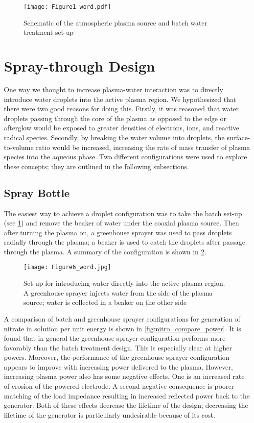 \begin{figure}[htbp]
  \centering
  \texttt{[image: Figure1\_word.pdf]}
  \caption{Schematic of the atmospheric plasma source and batch water treatment set-up}
  \label{fig:batch_scheme}
\end{figure}

\section{Spray-through Design}

One way we thought to increase plasma-water interaction was to directly introduce water droplets into the active plasma region. We hypothesized that there were two good reasons for doing this. Firstly, it was reasoned that water droplets passing through the core of the plasma as opposed to the edge or afterglow would be exposed to greater densities of electrons, ions, and reactive radical species. Secondly, by breaking the water volume into droplets, the surface-to-volume ratio would be increased, increasing the rate of mass transfer of plasma species into the aqueous phase. Two different configurations were used to explore these concepts; they are outlined in the following subsections.

\subsection{Spray Bottle}
\label{sec:spray_bottle}

The easiest way to achieve a droplet configuration was to take the batch set-up (see \cref{fig:batch_scheme}) and remove the beaker of water under the coaxial plasma source. Then after turning the plasma on, a greenhouse sprayer was used to pass droplets radially through the plasma; a beaker is used to catch the droplets after passage through the plasma. A summary of the configuration is shown in \cref{fig:spray_scheme}.

\begin{figure}[htbp]
  \centering
  \texttt{[image: Figure6\_word.jpg]}
  \caption{Set-up for introducing water directly into the active plasma region.  A greenhouse sprayer injects water from the side of the plasma source; water is collected in a beaker on the other side}
  \label{fig:spray_scheme}
\end{figure}

A comparison of batch and greenhouse sprayer configurations for generation of nitrate in solution per unit energy is shown in \cref{fig:nitro_compare_power}. It is found that in general the greenhouse sprayer configuration performs more favorably than the batch treatment design. This is especially clear at higher powers. Moreover, the performance of the greenhouse sprayer configuration appears to improve with increasing power delivered to the plasma. However, increasing plasma power also has some negative effects. One is an increased rate of erosion of the powered electrode. A second negative consequence is poorer matching of the load impedance resulting in increased reflected power back to the generator. Both of these effects decrease the lifetime of the design; decreasing the lifetime of the generator is particularly undesirable because of its cost.

